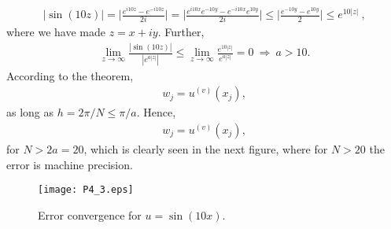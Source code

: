 \begin{align*}
|\sin(10z)| = \biggl| \frac{e^{i10z}-e^{-i10z}}{2i} \biggr| = \biggl| \frac{e^{i10x}e^{-10y} - e^{-i10x}e^{10y}}{2i} \biggr| \leq \biggl| \frac{e^{-10y}-e^{10y}}{2} \biggr| \leq e^{10|z|}~,
\end{align*}
where we have made $z=x+iy$. Further,
\begin{align*}
\lim_{z \rightarrow \infty} \frac{|\sin(10z)|}{|e^{a|z|}|} \leq \lim_{z \rightarrow \infty} \frac{e^{10|z|}}{e^{a|z|}} = 0 ~\Rightarrow ~a > 10.
\end{align*}
According to the theorem,
\begin{align*}
w_j = u^{(v)}(x_j),
\end{align*}
as long as $h =2\pi/N \leq \pi/a$. Hence,
\begin{align*}
w_j = u^{(v)}(x_j),
\end{align*}
for $N>2a=20$, which is clearly seen in the next figure, where for $N>20$ the error is machine precision.

\begin{figure}[H]
\centering
\texttt{[image: P4\_3.eps]}\caption{Error convergence for $u = \sin(10x)$.}
\end{figure}

